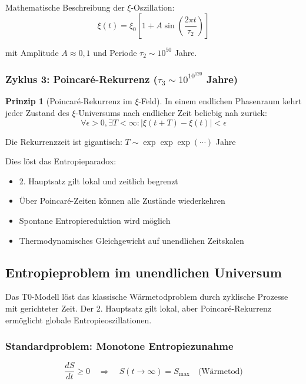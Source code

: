 \documentclass[12pt,a4paper]{article}
\theoremstyle{definition}
\newtheorem{principle}{Prinzip}
\begin{document}
	Mathematische Beschreibung der $\xi$-Oszillation:
	\begin{equation}
		\xi(t) = \xi_0 \left[1 + A \sin\left(\frac{2\pi t}{\tau_2}\right)\right]
	\end{equation}
	
	mit Amplitude $A \approx 0{,}1$ und Periode $\tau_2 \sim 10^{50}$ Jahre.
	
	\subsubsection{Zyklus 3: Poincaré-Rekurrenz ($\tau_3 \sim 10^{10^{120}}$ Jahre)}
	
	\begin{principle}[Poincaré-Rekurrenz im $\xi$-Feld]
		In einem endlichen Phasenraum kehrt jeder Zustand des $\xi$-Universums nach endlicher Zeit beliebig nah zurück:
		\begin{equation}
			\forall \epsilon > 0, \exists T < \infty: |\xi(t+T) - \xi(t)| < \epsilon
		\end{equation}
		
		Die Rekurrenzzeit ist gigantisch: $T \sim \exp\exp\exp(\cdots)$ Jahre
	\end{principle}
	
	Dies löst das Entropieparadox:
	\begin{itemize}
		\item 2. Hauptsatz gilt lokal und zeitlich begrenzt
		\item Über Poincaré-Zeiten können alle Zustände wiederkehren
		\item Spontane Entropiereduktion wird möglich
		\item Thermodynamisches Gleichgewicht auf unendlichen Zeitskalen
	\end{itemize}
	
	\subsection{Entropieproblem im unendlichen Universum}
	
	\begin{revolutionary}
		Das T0-Modell löst das klassische Wärmetodproblem durch zyklische Prozesse mit gerichteter Zeit. Der 2. Hauptsatz gilt lokal, aber Poincaré-Rekurrenz ermöglicht globale Entropieoszillationen.
	\end{revolutionary}
	
	\subsubsection{Standardproblem: Monotone Entropiezunahme}
	\begin{equation}
		\frac{dS}{dt} \geq 0 \quad \Rightarrow \quad S(t \to \infty) = S_{\text{max}} \quad \text{(Wärmetod)}
	\end{equation}
	
\end{document}
